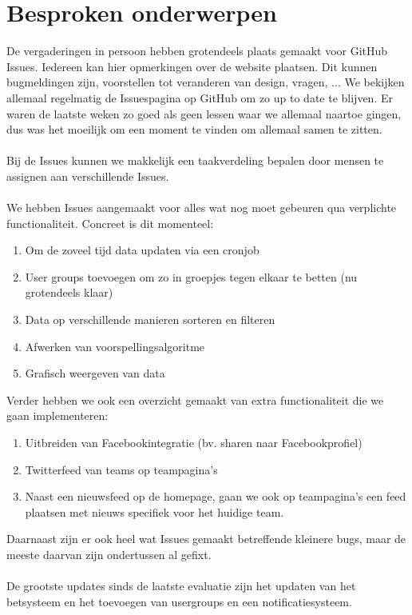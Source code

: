 \documentclass[11pt, a4paper]{article}
\begin{document}
\section{Besproken onderwerpen}
De vergaderingen in persoon hebben grotendeels plaats gemaakt voor GitHub Issues. Iedereen kan hier opmerkingen over de website plaatsen. Dit kunnen bugmeldingen zijn, voorstellen tot veranderen van design, vragen, ... We bekijken allemaal regelmatig de Issuespagina op GitHub om zo up to date te blijven. Er waren de laatste weken zo goed als geen lessen waar we allemaal naartoe gingen, dus was het moeilijk om een moment te vinden om allemaal samen te zitten.\\
\\
Bij de Issues kunnen we makkelijk een taakverdeling bepalen door mensen te assignen aan verschillende Issues.
\\
\\
We hebben Issues aangemaakt voor alles wat nog moet gebeuren qua verplichte functionaliteit. Concreet is dit momenteel: 
\begin{enumerate}
\item Om de zoveel tijd data updaten via een cronjob
\item User groups toevoegen om zo in groepjes tegen elkaar te betten (nu grotendeels klaar)
\item Data op verschillende manieren sorteren en filteren
\item Afwerken van voorspellingsalgoritme
\item Grafisch weergeven van data
\end{enumerate}
Verder hebben we ook een overzicht gemaakt van extra functionaliteit die we gaan implementeren:
\begin{enumerate}
\item Uitbreiden van Facebookintegratie (bv. sharen naar Facebookprofiel)
\item Twitterfeed van teams op teampagina's
\item Naast een nieuwsfeed op de homepage, gaan we ook op teampagina's een feed plaatsen met nieuws specifiek voor het huidige team.
\end{enumerate}
Daarnaast zijn er ook heel wat Issues gemaakt betreffende kleinere bugs, maar de meeste daarvan zijn ondertussen al gefixt.
\\
\\
De grootste updates sinds de laatste evaluatie zijn het updaten van het betsysteem en het toevoegen van usergroups en een notificatiesysteem.
\end{document}
